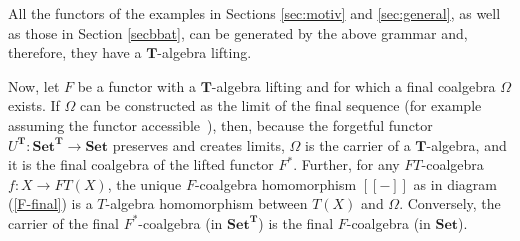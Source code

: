 \documentclass{LMCS}
\def\T{\mathbf{T}}
\def\Set{\mathbf{Set}}
\newcommand{\bb}[1]{[\![ #1 ]\!]}
\begin{document}
All the functors of the examples in Sections \ref{sec:motiv} and \ref{sec:general}, as well as those in Section \ref{secbbat}, 
can be generated by the above grammar and, therefore, they have a $\T$-algebra lifting.

\medskip

Now, let $F$ be a functor with a $\T$-algebra lifting and for which a final coalgebra $\Omega$ exists. If
$\Omega$ can be constructed as the limit of the final sequence (for example assuming the functor accessible~\cite{Ada74}),
then, because the forgetful functor $U^\T\colon\Set^\T \to \Set$ preserves and creates limits, $\Omega$ is the carrier
of a $\T$-algebra, and it is the final coalgebra of the lifted functor $F^*$. Further,
for any $FT$-coalgebra $f\colon X \to FT(X)$, the unique $F$-coalgebra homomorphism $\bb{-}$
as in diagram (\ref{F-final}) is a $T$-algebra homomorphism between $T(X)$ and $\Omega$.
Conversely, the carrier of the final $F^*$-coalgebra (in $\Set^\T$) is the final $F$-coalgebra
(in $\Set$). 
\end{document}
